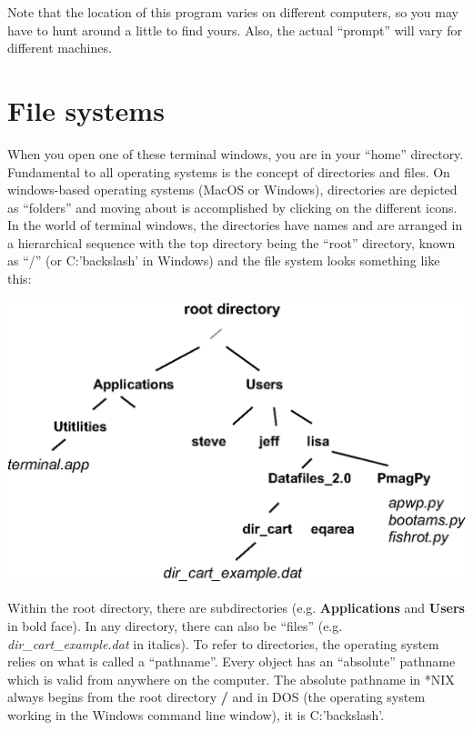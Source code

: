 \documentclass[11pt]{book}
\begin{document}
{  Note that the location of this program varies on different computers, so you may have to hunt around a little to find yours. Also, the actual  ``prompt'' will vary for different machines.



\section{File systems}
\label{sect:file_systems}
    When you open one of these terminal windows,  you are in your  ``home'' directory.
Fundamental to all  operating systems is the concept of
directories and files.  On windows-based operating systems (MacOS or Windows), directories are depicted
as ``folders'' and moving about is accomplished by clicking on the different icons.
In the world of terminal windows, the directories have names and are arranged in a hierarchical sequence with
the top directory being the ``root'' directory, known as  ``/'' (or C:'backslash' in Windows) and the file system looks something like this:


  \includegraphics[width=15cm]{EPSfiles/filesys.eps}

 Within the root directory, there are subdirectories
(e.g. {\bf Applications} and {\bf Users} in bold face).  In any directory, there can also be ``files''
(e.g. {\it dir\_cart\_example.dat} in italics).   To
refer to directories,  the operating system relies on what is called a ``pathname''. Every object
has an ``absolute'' pathname which is valid from anywhere on the computer.  The
absolute pathname in *NIX always begins from the root directory {\bf /} and in DOS (the operating system working in the Windows command line window), it is C:'backslash'.

}
\end{document}
